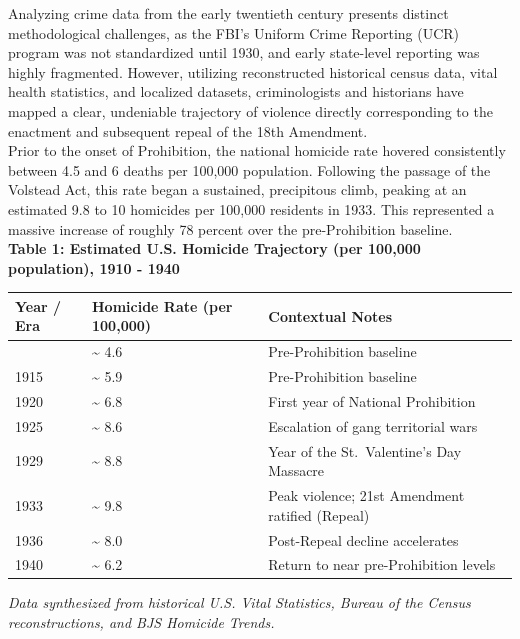 \documentclass[
]{article}
\newcounter{none} %
\begin{document}
Analyzing crime data from the early twentieth century presents distinct
methodological challenges, as the FBI's Uniform Crime Reporting (UCR)
program was not standardized until 1930, and early state-level reporting
was highly fragmented. However, utilizing reconstructed historical
census data, vital health statistics, and localized datasets,
criminologists and historians have mapped a clear, undeniable trajectory
of violence directly corresponding to the enactment and subsequent
repeal of the 18th Amendment.\\
Prior to the onset of Prohibition, the national homicide rate hovered
consistently between 4.5 and 6 deaths per 100,000 population. Following
the passage of the Volstead Act, this rate began a sustained,
precipitous climb, peaking at an estimated 9.8 to 10 homicides per
100,000 residents in 1933. This represented a massive increase of
roughly 78 percent over the pre-Prohibition baseline.\\
\textbf{Table 1: Estimated U.S. Homicide Trajectory (per 100,000
population), 1910 - 1940}

{\def\LTcaptype{none} %
\begin{longtable}[]{@{}lll@{}}
\toprule\noalign{}
Year / Era & Homicide Rate (per 100,000) & Contextual Notes \\
\midrule\noalign{}
\endhead
\bottomrule\noalign{}
\endlastfoot
1910 & \textasciitilde{} 4.6 & Pre-Prohibition baseline \\
1915 & \textasciitilde{} 5.9 & Pre-Prohibition baseline \\
1920 & \textasciitilde{} 6.8 & First year of National Prohibition \\
1925 & \textasciitilde{} 8.6 & Escalation of gang territorial wars \\
1929 & \textasciitilde{} 8.8 & Year of the St.~Valentine's Day
Massacre \\
1933 & \textasciitilde{} 9.8 & Peak violence; 21st Amendment ratified
(Repeal) \\
1936 & \textasciitilde{} 8.0 & Post-Repeal decline accelerates \\
1940 & \textasciitilde{} 6.2 & Return to near pre-Prohibition levels \\
\end{longtable}
}

\emph{Data synthesized from historical U.S. Vital Statistics, Bureau of
the Census reconstructions, and BJS Homicide Trends.}
\end{document}
